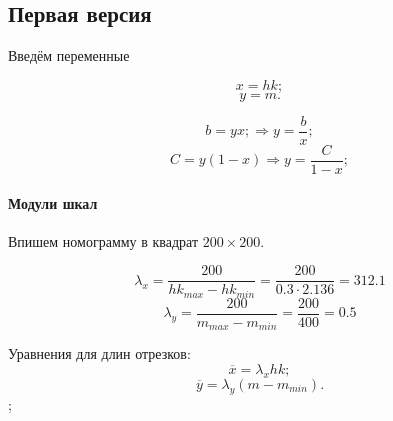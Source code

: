 \subsection{Первая версия}

Введём переменные

$$x = hk;$$
$$y = m.$$

$$b = yx; \Rightarrow y = \frac{b}{x};$$
$$C = y(1-x) \Rightarrow y = \frac{C}{1-x};$$

\paragraph{Модули шкал}
Впишем номограмму в квадрат $200 \times 200$.

$$\lambda_x = \frac{200}{hk_{max} - hk_{min}} = \frac{200}{0.3 \cdot 2.136} = 312.1$$
$$\lambda_y = \frac{200}{m_{max}- m_{min}} = \frac{200}{400} = 0.5$$

Уравнения для длин отрезков:
$$\overline{x} = \lambda_x hk;$$
$$\overline{y} = \lambda_y (m - m_{min}).$$;